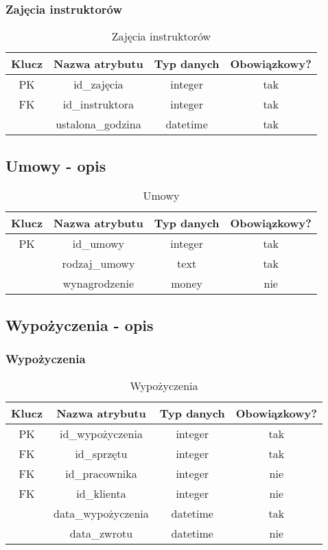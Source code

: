 \subsubsection{Zajęcia instruktorów}
\begin{table}[H]
	\centering
	\begin{tabular}{|c|c|c|c|}
		\hline
		Klucz & Nazwa atrybutu    & Typ danych & Obowiązkowy? \\ \hline
		PK    & id\_zajęcia      & integer    & tak           \\ \hline
		FK    & id\_instruktora   & integer    & tak           \\ \hline
		      & ustalona\_godzina & datetime   & tak           \\ \hline
	\end{tabular}
	\caption{Zajęcia instruktorów}
\end{table}

\subsection{Umowy - opis}
\begin{table}[H]
	\centering
	\begin{tabular}{|c|c|c|c|}
		\hline
		Klucz & Nazwa atrybutu & Typ danych & Obowiązkowy? \\ \hline
		PK    & id\_umowy      & integer    & tak           \\ \hline
		      & rodzaj\_umowy  & text       & tak           \\ \hline
		      & wynagrodzenie  & money      & nie           \\ \hline
	\end{tabular}
	\caption{Umowy}
\end{table}

\subsection{Wypożyczenia - opis}
\subsubsection{Wypożyczenia}
\begin{table}[H]
	\centering
	\begin{tabular}{|c|c|c|c|}
		\hline
		Klucz & Nazwa atrybutu      & Typ danych & Obowiązkowy? \\ \hline
		PK    & id\_wypożyczenia   & integer    & tak           \\ \hline
		FK    & id\_sprzętu        & integer    & tak           \\ \hline
		FK    & id\_pracownika      & integer    & nie           \\ \hline
		FK    & id\_klienta         & integer    & nie           \\ \hline
		      & data\_wypożyczenia & datetime   & tak           \\ \hline
		      & data\_zwrotu        & datetime   & nie           \\ \hline
	\end{tabular}
	\caption{Wypożyczenia}
\end{table}

